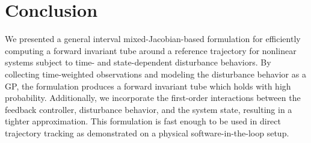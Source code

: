 \documentclass{IEEEojcsys}
\begin{document}
\section{Conclusion}
\label{section:conclusion}
We presented a general interval mixed-Jacobian-based formulation for efficiently computing a forward invariant tube around a reference trajectory for nonlinear systems subject to time- and state-dependent disturbance behaviors. By collecting time-weighted observations and modeling the disturbance behavior as a \ac{GP}, the formulation produces a forward invariant tube which holds with high probability. Additionally, we incorporate the first-order interactions between the feedback controller, disturbance behavior, and the system state, resulting in a tighter approximation. This formulation is fast enough to be used in direct trajectory tracking as demonstrated on a physical software-in-the-loop setup.





 








\end{document}
